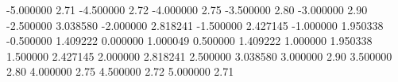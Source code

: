 -5.000000  2.71 
-4.500000  2.72 
-4.000000  2.75 
-3.500000  2.80
-3.000000  2.90 
-2.500000  3.038580 
-2.000000  2.818241 
-1.500000  2.427145 
-1.000000  1.950338 
-0.500000  1.409222 
0.000000  1.000049 
0.500000  1.409222 
1.000000  1.950338 
1.500000  2.427145 
2.000000  2.818241 
2.500000  3.038580 
3.000000  2.90 
3.500000  2.80
4.000000  2.75 
4.500000  2.72 
5.000000  2.71 
